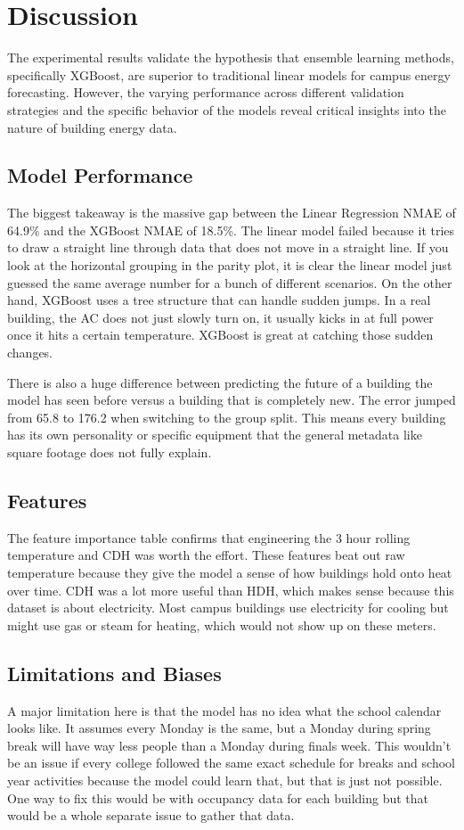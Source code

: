 \documentclass[conference]{IEEEtran}
\begin{document}
\section{Discussion}
The experimental results validate the hypothesis that ensemble learning methods, specifically XGBoost, are superior to traditional linear models for campus energy forecasting. However, the varying performance across different validation strategies and the specific behavior of the models reveal critical insights into the nature of building energy data.

\subsection{Model Performance} 
The biggest takeaway is the massive gap between the Linear Regression NMAE of 64.9\% and the XGBoost NMAE of 18.5\%. The linear model failed because it tries to draw a straight line through data that does not move in a straight line. If you look at the horizontal grouping in the parity plot, it is clear the linear model just guessed the same average number for a bunch of different scenarios. On the other hand, XGBoost uses a tree structure that can handle sudden jumps. In a real building, the AC does not just slowly turn on, it usually kicks in at full power once it hits a certain temperature. XGBoost is great at catching those sudden changes.

There is also a huge difference between predicting the future of a building the model has seen before versus a building that is completely new. The error jumped from 65.8 to 176.2 when switching to the group split. This means every building has its own personality or specific equipment that the general metadata like square footage does not fully explain.

\subsection{Features} 
The feature importance table confirms that engineering the 3 hour rolling temperature and CDH was worth the effort. These features beat out raw temperature because they give the model a sense of how buildings hold onto heat over time. CDH was a lot more useful than HDH, which makes sense because this dataset is about electricity. Most campus buildings use electricity for cooling but might use gas or steam for heating, which would not show up on these meters.

\subsection{Limitations and Biases} 
A major limitation here is that the model has no idea what the school calendar looks like. It assumes every Monday is the same, but a Monday during spring break will have way less people than a Monday during finals week. This wouldn’t be an issue if every college followed the same exact schedule for breaks and school year activities because the model could learn that, but that is just not possible. One way to fix this would be with occupancy data for each building but that would be a whole separate issue to gather that data.
\end{document}
